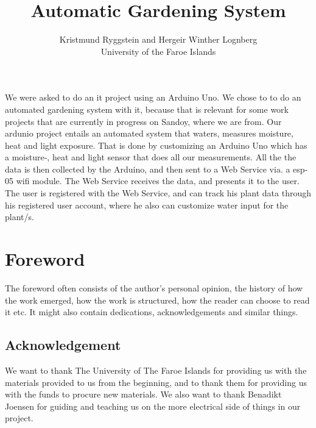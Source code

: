 \documentclass[a4paper,12pt,twoside,openright,titlepage]{book}
\title{Automatic Gardening System}
\author{Kristmund Ryggstein and Hergeir Winther Lognberg \\ University of the Faroe Islands\\}
\newenvironment{abstract}%
{\cleardoublepage\addcontentsline{toc}{chapter}{Abstract}\null\vfill\begin{center}%
\bfseries\abstractname\end{center}}%
{\vfill\null}
\begin{document}
\frontmatter
\maketitle

\frontmatter
\maketitle

\begin{abstract}
We were asked to do an it project using an Arduino Uno. We chose to to do an automated gardening system with it, because that is relevant for some work projects that are currently in progress on Sandoy, where we are from. Our ardunio project entails an automated system that waters, measures moisture, heat and light exposure. That is done by customizing an Arduino Uno which has a moisture-, heat and light sensor that does all our measurements. All the the data is then collected by the Arduino, and then sent to a Web Service via. a esp-05 wifi module. The Web Service receives the data, and presents it to the user. The user is registered with the Web Service, and can track his plant data through his registered user account, where he also can customize water input for the plant/s.
\end{abstract}

\cleardoublepage{}
\tableofcontents

\chapter{Foreword}

The foreword often consists of the author's personal opinion, the history of how the work emerged, how the work is structured, how the reader can choose to read it etc. It might also contain dedications, acknowledgements and similar things. 

\section*{Acknowledgement}
We want to thank The University of The Faroe Islands for providing us with the materials provided to us from the beginning, and to thank them for providing us with the funds to procure new materials. We also want to thank Benadikt Joensen for guiding  and teaching us on the more electrical side of things in our project.
\end{document}

